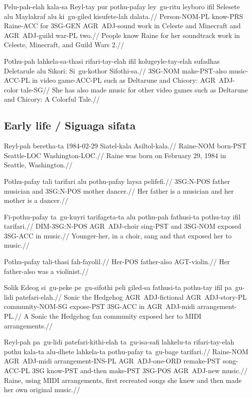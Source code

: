 \ex
\begingl 
\gla  Pelu-pah-elah kala-sa Reyl-tay pur pothu-pafay ley~gu-ritu leyboro ifil Selesete alu Maylakraf alu ki~gu-giled kisufete-lah dalata.//
\glb  Person-NOM-PL know-PRS Raine-ACC for 3SG-GEN AGR~ADJ-sound work in Celeste and Minecraft and AGR~ADJ-guild war-PL two.//
\glft People know Raine for her soundtrack work in Celeste, {} Minecraft, and Guild Wars 2.//
\endgl 
\xe

\ex
\begingl
\gla  Pothu-pah lahkela-sa-thasi rifari-tay-elah ifil kolugeyle-tay-elah sufadhas Deletarule alu Sikori: Si~gu-kothor Sifothi-sa.//
\glb  3SG-NOM make-PST-also music-ACC-PL in video game-ACC-PL such as Deltarune and Chicory: AGR~ADJ-color tale-SG//
\glft She has also made music for other video games such as Deltarune and Chicory: A Colorful Tale.//
\endgl 
\xe

\subsection{Early life / Siguaga sifata}

\ex
\begingl
\gla  Reyl-pah beretha-ta  1984-02-29  Siatel-kala Asiltol-kala.//
\glb  Raine-NOM born-PST    Seattle-LOC  Washington-LOC.//
\glft Raine was born on February 29, 1984 in Seattle, Washington.//
\endgl
\xe

\ex
\begingl
\gla  Pothu-pafay tali  tarifari alu pothu-pafay laysa  pelifefi.//
\glb  3SG:N-POS father musician and 3SG:N-POS mother dancer.//
\glft Her father is a musician and her mother is a dancer.//
\endgl
\xe

\ex
\begingl
\gla  Fi-pothu-pafay ta~gu-kuyri tarifageta-ta alu pothu-pah fathusi-ta pothu-tay ifil tarifari.//
\glb  DIM-3SG:N-POS AGR~ADJ-choir sing-PST and 3SG-NOM exposed 3SG-ACC in music.//
\glft Younger-her, in a choir, sang and that exposed her to music.//
\endgl
\xe

\ex
\begingl
\gla  Pothu-pafay tali-thasi  fah-fayolil.//
\glb  Her-POS father-also AGT-violin.//
\glft Her father-also was a violinist.//
\endgl
\xe

\ex
\begingl
\gla  Solik Edeog si~gu-peke pe~gu-sifothi peli giled-sa fathusi-ta pothu-tay ifil pa~gu-lidi patefari-elah.//
\glb  Sonic the Hedgehog AGR~ADJ-fictional AGR~ADJ-story-PL community-NOM-SG expose-PST 3SG-ACC in AGR~ADJ-midi arrangement-PL.//
\glft A Sonic the Hedgehog fan community exposed her to MIDI arrangements.//
\endgl
\xe

\ex
\begingl
\gla  Reyl-pah pa~gu-lidi patefari-kithi-elah ta~gu-isa-safi lahkelu-ta rifari-tay-elah pothu kala-ta alu-dhete lahkela-ta pothu-pafay ta~gu-bage tarifari.//
\glb  Raine-NOM AGR~ADJ-midi arrangement-INS-PL AGR~ADJ-one-ORD remake-PST song-ACC-PL 3SG know-PST and-then make-PST 3SG-POS AGR~ADJ-new music.//
\glft Raine, using MIDI arrangements, first recreated songs she knew and then made her own original music.//
\endgl
\xe

